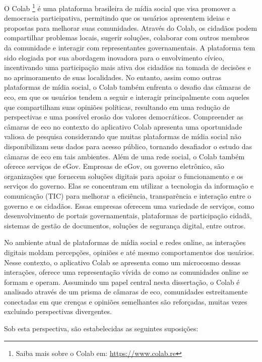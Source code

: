 O Colab \footnote{Saiba mais sobre o Colab em: \url{https://www.colab.re}} é uma plataforma brasileira de mídia social que visa promover a democracia participativa, permitindo que os usuários apresentem ideias e propostas para melhorar suas comunidades. Através do Colab, os cidadãos podem compartilhar problemas locais, sugerir soluções, colaborar com outros membros da comunidade e interagir com representantes governamentais. A plataforma tem sido elogiada por sua abordagem inovadora para o envolvimento cívico, incentivando uma participação mais ativa dos cidadãos na tomada de decisões e no aprimoramento de suas localidades. No entanto, assim como outras plataformas de mídia social, o Colab também enfrenta o desafio das câmaras de eco, em que os usuários tendem a seguir e interagir principalmente com aqueles que compartilham suas opiniões políticas, resultando em uma redução de perspectivas e uma possível erosão dos valores democráticos. Compreender as câmaras de eco no contexto do aplicativo Colab apresenta uma oportunidade valiosa de pesquisa considerando que muitas plataformas de mídia social não disponibilizam seus dados para acesso público, tornando desafiador o estudo das câmaras de eco em tais ambientes. Além de uma rede social, o Colab também oferece serviços de eGov. Empresas de eGov, ou governo eletrônico, são organizações que fornecem soluções digitais para apoiar o funcionamento e os serviços do governo. Elas se concentram em utilizar a tecnologia da informação e comunicação (TIC) para melhorar a eficiência, transparência e interação entre o governo e os cidadãos. Essas empresas oferecem uma variedade de serviços, como desenvolvimento de portais governamentais, plataformas de participação cidadã, sistemas de gestão de documentos, soluções de segurança digital, entre outros.

No ambiente atual de plataformas de mídia social e redes online, as interações digitais moldam percepções, opiniões e até mesmo comportamentos dos usuários. Nesse contexto, o aplicativo Colab se apresenta como um microcosmo dessas interações, oferece uma representação vívida de como as comunidades online se formam e operam. Assumindo um papel central nesta dissertação, o Colab é analisado através de um prisma de câmaras de eco, comunidades estreitamente conectadas em que crenças e opiniões semelhantes são reforçadas, muitas vezes excluindo perspectivas divergentes.

Sob esta perspectiva, são estabelecidas as seguintes suposições:

